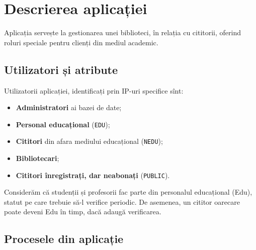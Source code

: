 
\chapter{Descrierea aplicației}

Aplicația servește la gestionarea unei biblioteci, în relația cu cititorii,
oferind roluri speciale pentru clienți din mediul academic.

\section{Utilizatori și atribute}
\label{sec:util-atr}

Utilizatorii aplicației, identificați prin IP-uri specifice sînt:
\begin{itemize}
    \item \textbf{Administratori} ai bazei de date;
    \item \textbf{Personal educațional} (\texttt{EDU});
    \item \textbf{Cititori} din afara mediului educațional (\texttt{NEDU});
    \item \textbf{Bibliotecari};
    \item \textbf{Cititori înregistrați, dar neabonați} (\texttt{PUBLIC}).
\end{itemize}

Considerăm că studenții și profesorii fac parte din personalul educațional
(Edu), statut pe care trebuie să-l verifice periodic. De asemenea, un
cititor oarecare poate deveni Edu în timp, dacă adaugă verificarea.

\section{Procesele din aplicație}
\label{sec:procese}

